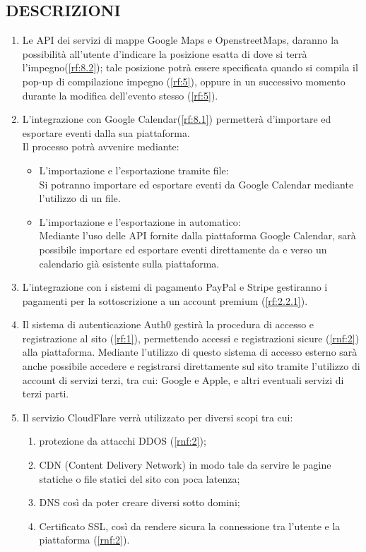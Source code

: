 \subsection*{DESCRIZIONI}
\begin{enumerate}
    \item Le API dei servizi di mappe Google Maps e OpenstreetMaps, daranno la possibilità all'utente d'indicare la posizione esatta di dove si terrà l'impegno(\ref{rf:8.2}); tale posizione potrà essere specificata quando si compila il pop-up di compilazione impegno (\ref{rf:5}), oppure in un successivo momento durante la modifica dell'evento stesso (\ref{rf:5}).

    \item L'integrazione con Google Calendar(\ref{rf:8.1}) permetterà d'importare ed esportare eventi dalla sua piattaforma.\\
          Il processo potrà avvenire mediante:
          \begin{itemize}
              \item L'importazione e l'esportazione tramite file: \\
                    Si potranno importare ed esportare eventi da Google Calendar mediante l'utilizzo di un file.
              \item L'importazione e l'esportazione in automatico: \\
                    Mediante l'uso delle API fornite dalla piattaforma Google Calendar, sarà possibile importare ed esportare eventi direttamente da e verso un calendario già esistente sulla piattaforma.
          \end{itemize}

    \item L'integrazione con i sistemi di pagamento PayPal e Stripe gestiranno i pagamenti per la sottoscrizione a un account premium (\ref{rf:2.2.1}).

    \item Il sistema di autenticazione Auth0 gestirà la procedura di accesso e registrazione al sito (\ref{rf:1}), permettendo accessi e registrazioni sicure (\ref{rnf:2}) alla piattaforma. Mediante l'utilizzo di questo sistema di accesso esterno sarà anche possibile accedere e registrarsi direttamente sul sito tramite l'utilizzo di account di servizi terzi, tra cui: Google e Apple, e altri eventuali servizi di terzi parti.

    \item Il servizio CloudFlare verrà utilizzato per diversi scopi tra cui:
          \begin{enumerate}
              \item protezione da attacchi DDOS (\ref{rnf:2});
              \item CDN (Content Delivery Network) in modo tale da servire le pagine statiche o file statici del sito con poca latenza;
              \item DNS così da poter creare diversi sotto domini;
              \item Certificato SSL, così da rendere sicura la connessione tra l'utente e la piattaforma (\ref{rnf:2}).
          \end{enumerate}


\end{enumerate}
